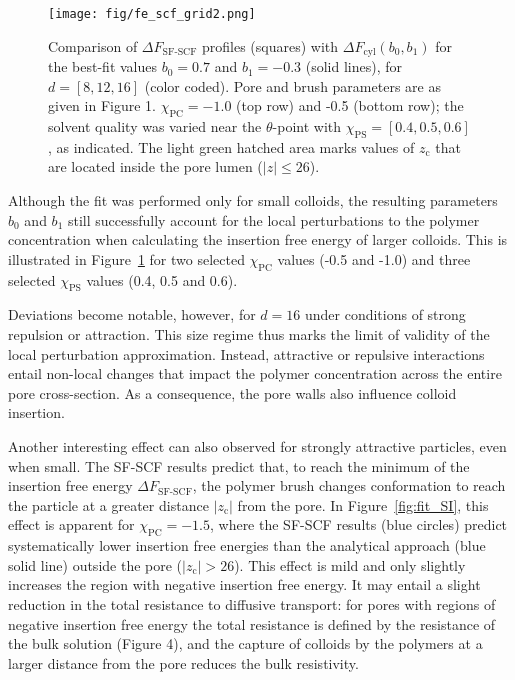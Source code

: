\documentclass[10pt, a4paper, twocolumn]{article}
\begin{document}
\begin{figure}[]
    \centering
    \texttt{[image: fig/fe\_scf\_grid2.png]}
    \caption{ 
    Comparison of $\Delta F_{\text{SF-SCF}}$ profiles (squares) with $\Delta F_{\text{cyl}}(b_0,b_1)$ for the best-fit values $b_0 = 0.7$ and $b_1 = -0.3$ (solid lines), for $d = [8, 12, 16]$ (color coded).
    Pore and brush parameters are as given in Figure 1. $\chi_{\text{PC}} = -1.0$ (top row) and -0.5 (bottom row); the solvent quality was varied near the $\theta$-point with $\chi_{\text{PS}} = [0.4, 0.5, 0.6]$, as indicated.
    The light green hatched area marks values of $z_{\text{c}}$ that are located inside the pore lumen ($|z| \leq 26$).
    \label{fig:fe_scf_grid}
    }
\end{figure}

Although the fit was performed only for small colloids, the resulting parameters $b_{0}$ and $b_{1}$ still successfully account for the local perturbations to the polymer concentration when calculating the insertion free energy of larger colloids.
This is illustrated in Figure~\ref{fig:fe_scf_grid} for two selected $\chi_{\text{PC}}$ values (-0.5 and -1.0) and three selected $\chi_{\text{PS}}$ values (0.4, 0.5 and 0.6).

Deviations become notable, however, for $d = 16$ under conditions of strong repulsion or attraction.
This size regime thus marks the limit of validity of the local perturbation approximation.
Instead, attractive or repulsive interactions entail non-local changes that impact the polymer concentration across the entire pore cross-section.
As a consequence, the pore walls also influence colloid insertion. 

Another interesting effect can also observed for strongly attractive particles, even when small.
The SF-SCF results predict that, to reach the minimum of the insertion free energy $\Delta F_{\text{SF-SCF}}$, the polymer brush changes conformation to reach the particle at a greater distance $|z_{\text{c}}|$ from the pore.
In Figure~\ref{fig:fit_SI}, this effect is apparent for $\chi_{\text{PC}} = -1.5$, where the SF-SCF results (blue circles) predict systematically lower insertion free energies than the analytical approach (blue solid line) outside the pore ($|z_{\text{c}}| > 26$).
This effect is mild and only slightly increases the region with negative insertion free energy.
It may entail a slight reduction in the total resistance to diffusive transport: for pores with regions of negative insertion free energy the total resistance is defined by the resistance of the bulk solution (Figure 4), and the capture of colloids by the polymers at a larger distance from the pore reduces the bulk resistivity.
\end{document}
